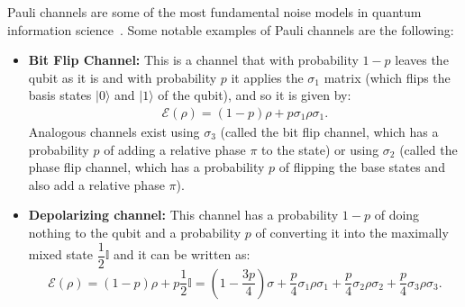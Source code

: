 \documentclass[10pt,letterpaper]{article} %
\begin{document}
Pauli channels are some of the 
most fundamental noise models in quantum information science~\cite{Terhal}. 
Some notable examples of Pauli channels are the following:
\begin{itemize}
\item \textbf{Bit Flip Channel:} This is a channel that with probability $1-p$ leaves the qubit as it is 
and with probability $p$ it applies the $\sigma_1$ matrix 
(which flips the basis states $|0\rangle$ and $|1\rangle$ of the qubit), and
so it is given by:
\begin{align*}
\mathcal{E}(\rho) = (1-p) \rho + p \sigma_1 \rho \sigma_1.
\end{align*}
Analogous channels exist using $\sigma_3$ (called the bit flip channel,
which has a probability $p$ of adding a relative phase $\pi$ to the state) or 
using $\sigma_2$ (called the phase flip channel, 
which has a probability $p$ of 
flipping the base states and also add a relative phase $\pi$).
\item \textbf{Depolarizing channel:} 
This channel has a probability $1-p$
of doing nothing to the qubit and a probability $p$ of converting it into the maximally mixed state $\dfrac{1}{2} \mathbb{I}$
and it can be written as:
\begin{equation}
\mathcal{E}(\rho) = (1-p)\rho + p \dfrac{1}{2} \mathbb{I} = \left(1 - \dfrac{3p}{4} \right) \sigma + \dfrac{p}{4} \sigma_1 \rho \sigma_1 + \dfrac{p}{4} \sigma_2 \rho \sigma_2+ \dfrac{p}{4} \sigma_3 \rho \sigma_3.
\end{equation} 
\end{itemize}
\end{document}
